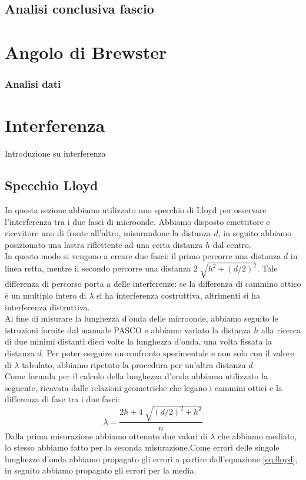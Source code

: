 \documentclass[letterpaper,12pt]{article}
\begin{document}
\subsection{Analisi conclusiva fascio}


\section{Angolo di Brewster}

\subsubsection{Analisi dati} 

\section{Interferenza}
Introduzione su interferenza 

\subsection{Specchio Lloyd}
In questa sezione abbiamo utilizzato uno specchio di Lloyd per osservare l'interferenza tra i due fasci di microonde. 
Abbiamo disposto emettitore e ricevitore uno di fronte all'altro, misurandone la distanza $d$, in seguito abbiamo 
posizionato una lastra riflettente ad una certa distanza $h$ dal centro. \\
In questo modo si vengono a creare due fasci: il primo percorre una distanza $d$ in linea retta, mentre il secondo
percorre una distanza $2 \sqrt[]{h^2 + (d/2)^2}$. Tale differenza di percorso porta a delle interferenze: 
se la differenza di cammino ottico è un multiplo intero di $\lambda$ si ha interferenza costruttiva, 
altrimenti si ha interferenza distruttiva.\\
Al fine di misurare la lunghezza d'onda delle microonde, abbiamo seguito le istruzioni fornite dal manuale 
PASCO e abbiamo variato la distanza $h$ alla ricerca di due minimi distanti dieci volte la lunghezza d'onda,
una volta fissata la distanza $d$. Per poter eseguire un confronto sperimentale e non solo con il valore di $\lambda$
tabulato, abbiamo ripetuto la procedura per un'altra distanza $d$. \\
Come formula per il calcolo della lunghezza d'onda abbiamo utilizzato la seguente, ricavata dalle relazioni geometriche
che legano i cammini ottici e la differenza di fase tra i due fasci:
\begin{equation}
    \lambda = \frac{2h + 4 \sqrt[]{(d/2)^2 + h^2}}{n}
    \label{eq:lloyd}
\end{equation}
Dalla prima misurazione abbiamo ottenuto due valori di $\lambda$ che abbiamo mediato, lo stesso abbiamo fatto per 
la seconda misurazione.Come errori delle singole lunghezze d'onda abbiamo propagato gli errori a partire dall'equazione
\ref{eq:lloyd}, in seguito abbiamo propagato gli errori per la media. \\
\end{document}
